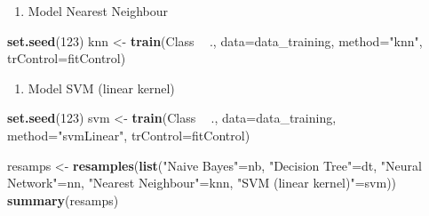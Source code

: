 \documentclass[]{article}
\newenvironment{Shaded}{\begin{snugshade}}{\end{snugshade}}
\newcommand{\DataTypeTok}[1]{\textcolor[rgb]{0.13,0.29,0.53}{#1}}
\newcommand{\DecValTok}[1]{\textcolor[rgb]{0.00,0.00,0.81}{#1}}
\newcommand{\KeywordTok}[1]{\textcolor[rgb]{0.13,0.29,0.53}{\textbf{#1}}}
\newcommand{\NormalTok}[1]{#1}
\newcommand{\OperatorTok}[1]{\textcolor[rgb]{0.81,0.36,0.00}{\textbf{#1}}}
\newcommand{\StringTok}[1]{\textcolor[rgb]{0.31,0.60,0.02}{#1}}
\providecommand{\tightlist}{%
  \setlength{\itemsep}{0pt}\setlength{\parskip}{0pt}}
\begin{document}
\begin{enumerate}
\def\labelenumi{\arabic{enumi}.}
\setcounter{enumi}{3}
\tightlist
\item
  Model Nearest Neighbour
\end{enumerate}

\begin{Shaded}
\begin{Highlighting}[]
\KeywordTok{set.seed}\NormalTok{(}\DecValTok{123}\NormalTok{)}
\NormalTok{knn <-}\StringTok{ }\KeywordTok{train}\NormalTok{(Class }\OperatorTok{~}\StringTok{ }\NormalTok{., }
             \DataTypeTok{data=}\NormalTok{data_training, }
             \DataTypeTok{method=}\StringTok{"knn"}\NormalTok{,}
             \DataTypeTok{trControl=}\NormalTok{fitControl)}
\end{Highlighting}
\end{Shaded}

\begin{enumerate}
\def\labelenumi{\arabic{enumi}.}
\setcounter{enumi}{4}
\tightlist
\item
  Model SVM (linear kernel)
\end{enumerate}

\begin{Shaded}
\begin{Highlighting}[]
\KeywordTok{set.seed}\NormalTok{(}\DecValTok{123}\NormalTok{)}
\NormalTok{svm <-}\StringTok{ }\KeywordTok{train}\NormalTok{(Class }\OperatorTok{~}\StringTok{ }\NormalTok{., }
             \DataTypeTok{data=}\NormalTok{data_training, }
             \DataTypeTok{method=}\StringTok{"svmLinear"}\NormalTok{,}
             \DataTypeTok{trControl=}\NormalTok{fitControl)}
\end{Highlighting}
\end{Shaded}

\begin{Shaded}
\begin{Highlighting}[]
\NormalTok{resamps <-}\StringTok{ }\KeywordTok{resamples}\NormalTok{(}\KeywordTok{list}\NormalTok{(}\StringTok{"Naive Bayes"}\NormalTok{=nb,}
                          \StringTok{"Decision Tree"}\NormalTok{=dt,}
                          \StringTok{"Neural Network"}\NormalTok{=nn,}
                          \StringTok{"Nearest Neighbour"}\NormalTok{=knn,}
                          \StringTok{"SVM (linear kernel)"}\NormalTok{=svm))}
\KeywordTok{summary}\NormalTok{(resamps)}
\end{Highlighting}
\end{Shaded}
\end{document}
